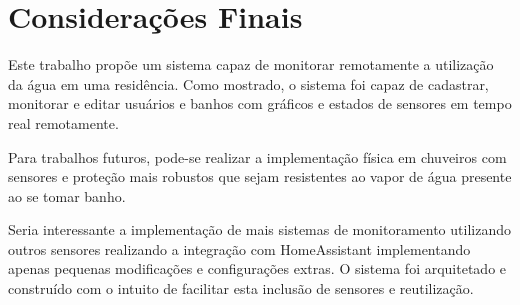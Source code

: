 \chapter{Considerações Finais}

Este trabalho propõe um sistema capaz de monitorar remotamente a utilização da água em uma residência. Como mostrado, o sistema foi capaz de cadastrar, monitorar e editar usuários e banhos com gráficos e estados de sensores em tempo real remotamente.

Para trabalhos futuros, pode-se realizar a implementação física em chuveiros com sensores e proteção mais robustos que sejam resistentes ao vapor de água presente ao se tomar banho. 

Seria interessante a implementação de mais sistemas de monitoramento utilizando outros sensores realizando a integração com HomeAssistant implementando apenas pequenas modificações e configurações extras. O sistema foi arquitetado e construído com o intuito de facilitar esta inclusão de sensores e reutilização.